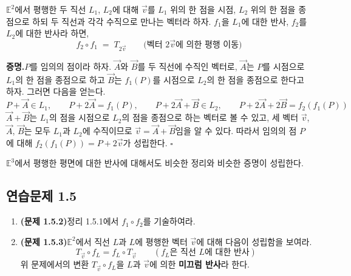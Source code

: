 \documentclass{article}
\begin{document}
\begin{tcolorbox}[
  colback=red!4, colframe=red!60!black,
  title=정리 1.5.1\quad 두 평행 직선의 반사 합성,
  fonttitle=\bfseries, boxrule=0.5mm, arc=3mm]

$\mathbb{E}^2$에서 평행한 두 직선 $L_1$, $L_2$에 대해
$\vec{v}$를 $L_1$ 위의 한 점을 시점, $L_2$ 위의 한 점을 종점으로 하되
두 직선과 각각 수직으로 만나는 벡터라 하자.
$f_1$을 $L_1$에 대한 반사, $f_2$를 $L_2$에 대한 반사라 하면,
\[
  f_2 \circ f_1 \;=\; T_{2\vec{v}} \qquad \text{(벡터 $2\vec{v}$에 의한 평행 이동)}
\]

\end{tcolorbox}

\textbf{증명.}\quad $P$를 임의의 점이라 하자.
$\vec{A}$와 $\vec{B}$를 두 직선에 수직인 벡터로,
$\vec{A}$는 $P$를 시점으로 $L_1$의 한 점을 종점으로 하고
$\vec{B}$는 $f_1(P)$를 시점으로 $L_2$의 한 점을 종점으로 한다고 하자.
그러면 다음을 얻는다.
\[
  P + \vec{A} \in L_1, \qquad
  P + 2\vec{A} = f_1(P), \qquad
  P + 2\vec{A} + \vec{B} \in L_2, \qquad
  P + 2\vec{A} + 2\vec{B} = f_2(f_1(P))
\]
$\vec{A}+\vec{B}$는 $L_1$의 점을 시점으로 $L_2$의 점을 종점으로 하는 벡터로 볼 수 있고,
세 벡터 $\vec{v}$, $\vec{A}$, $\vec{B}$는 모두 $L_1$과 $L_2$에 수직이므로
$\vec{v} = \vec{A}+\vec{B}$임을 알 수 있다.
따라서 임의의 점 $P$에 대해 $f_2(f_1(P)) = P + 2\vec{v}$가 성립한다.
\hfill $\square$

\smallskip
$\mathbb{E}^3$에서 평행한 평면에 대한 반사에 대해서도 비슷한 정리와 비슷한 증명이 성립한다.

\subsection*{연습문제 1.5}

\begin{enumerate}
  \item \textbf{(문제 1.5.2)}\quad 정리 1.5.1에서 $f_1 \circ f_2$를 기술하여라.

  \item \textbf{(문제 1.5.3)}\quad $\mathbb{E}^2$에서 직선 $L$과 $L$에 평행한 벡터 $\vec{v}$에 대해
    다음이 성립함을 보여라.
    \[
      T_{\vec{v}} \circ f_L = f_L \circ T_{\vec{v}}
      \qquad (f_L \text{은 직선 } L \text{에 대한 반사})
    \]
    위 문제에서의 변환 $T_{\vec{v}} \circ f_L$을 $L$과 $\vec{v}$에 의한 \textbf{미끄럼 반사}라 한다.
\end{enumerate}
\end{document}
